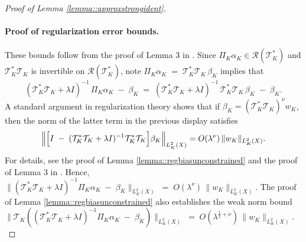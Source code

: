 \documentclass[11pt]{article}
\theoremstyle{plain}
\theoremstyle{definition}
\theoremstyle{remark}
\theoremstyle{definition}
\begin{document}
\begin{proof}[Proof of Lemma \ref{lemma::approxstrongident}]
\paragraph{Proof of regularization error bounds.} These bounds follow from the proof of Lemma 3 in \cite{bennett2023source}. Since \(\Pi_{K} \alpha_K \in \mathcal{R}(\mathcal{T}_{K}^*)\) and \(\mathcal{T}_{K}^* \mathcal{T}_{K}\) is invertible on \(\mathcal{R}(\mathcal{T}_{K}^*)\), note $\Pi_{K} \alpha_K \;=\; \mathcal{T}_{K}^* \mathcal{T}_{K}\,\beta_{K}$ implies that
\[
(\mathcal{T}_{K}^* \mathcal{T}_{K} + \lambda I)^{-1}\,\Pi_{K} \alpha_K 
\;-\;\beta_{K} 
\;=\;
(\mathcal{T}_{K}^* \mathcal{T}_{K} + \lambda I)^{-1}\,\mathcal{T}_{K}^* \mathcal{T}_{K}\,\beta_{K} 
\;-\;\beta_{K}.
\]
 A standard argument in regularization theory shows that if 
$\beta_{K}  = (\mathcal{T}_{K}^* \mathcal{T}_{K})^{\nu} w_{K}$, then the norm of the latter term in the previous display satisfies
\[
\Bigl\|\Bigl[I \;-\;(\mathcal{T}_{K}^* \mathcal{T}_{K}+\lambda I)^{-1}\mathcal{T}_{K}^* \mathcal{T}_{K}\Bigr]\beta_{K}\Bigr\|_{L^2_K(X)} 
= O(\lambda^\nu)\,\|w_{K}\|_{L^2_K(X)}.
\]
For details, see the proof of Lemma \ref{lemma::regbiasunconstrained} and the proof of Lemma 3 in \cite{bennett2023source}. Hence, \(\|(\mathcal{T}_{K}^* \mathcal{T}_{K} + \lambda I)^{-1} \Pi_{K} \alpha_K \;-\;\beta_{K}\|_{L^2_K(X)}
\;=\;
O(\lambda^\nu)\,\|w_{K}\|_{L^2_K(X)}.\)
The proof of Lemma \ref{lemma::regbiasunconstrained} also establishes the weak norm bound \(\|\mathcal{T}_{K}((\mathcal{T}_{K}^* \mathcal{T}_{K} + \lambda I)^{-1} \Pi_{K} \alpha_K \;-\;\beta_{K})\|_{L^2_K(X)}
\;=\;
O(\lambda^{\frac{1}{2} + \nu})\,\|w_{K}\|_{L^2_K(X)}.\)


\end{proof}
\end{document}
